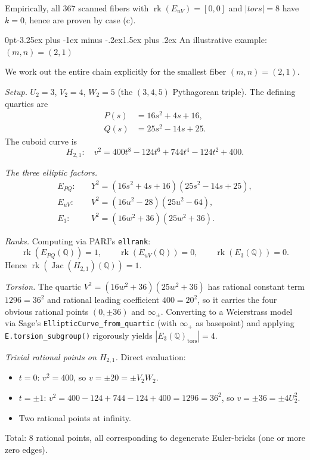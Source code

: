 \documentclass[12pt,a4paper,reqno]{amsart}
\makeatletter
\renewcommand{\subsection}{\@startsection{subsection}{2}%
  {0pt}{-3.25ex plus -1ex minus -.2ex}{1.5ex plus .2ex}%
  {\normalfont\normalsize\bfseries}}
\theoremstyle{plain}
\theoremstyle{definition}
\theoremstyle{remark}
\newcommand{\Q}{\mathbb{Q}}
\newcommand{\Jac}{\operatorname{Jac}}
\newcommand{\rk}{\operatorname{rk}}
\newcommand{\tors}{\mathrm{tors}}
\makeatother
\begin{document}
Empirically, all $367$ scanned fibers with $\rk(E_{uV}) = [0, 0]$ and $|tors| = 8$ have $k = 0$, hence are proven by case (c).

\subsection{An illustrative example: $(m, n) = (2, 1)$}
\label{ssec:example21}

We work out the entire chain explicitly for the smallest fiber $(m, n) = (2, 1)$.

\emph{Setup.} $U_2 = 3$, $V_2 = 4$, $W_2 = 5$ (the $(3, 4, 5)$ Pythagorean triple). The defining quartics are
\begin{align*}
P(s) &= 16 s^2 + 4 s + 16, \\
Q(s) &= 25 s^2 - 14 s + 25.
\end{align*}
The cuboid curve is
$$
H_{2,1}: \quad v^2 = 400 t^8 - 124 t^6 + 744 t^4 - 124 t^2 + 400.
$$

\emph{The three elliptic factors.}
\begin{align*}
E_{PQ}: \quad & Y^2 = (16 s^2 + 4 s + 16)(25 s^2 - 14 s + 25), \\
E_{uV}: \quad & V^2 = (16 u^2 - 28)(25 u^2 - 64), \\
E_3:    \quad & V^2 = (16 w^2 + 36)(25 w^2 + 36).
\end{align*}

\emph{Ranks.} Computing via PARI's \texttt{ellrank}:
$$
\rk(E_{PQ}(\Q)) = 1, \qquad \rk(E_{uV}(\Q)) = 0, \qquad \rk(E_3(\Q)) = 0.
$$
Hence $\rk(\Jac(H_{2,1})(\Q)) = 1$.

\emph{Torsion.} The quartic $V^2 = (16w^2 + 36)(25 w^2 + 36)$ has rational constant term $1296 = 36^2$ and rational leading coefficient $400 = 20^2$, so it carries the four obvious rational points $(0, \pm 36)$ and $\infty_\pm$. Converting to a Weierstrass model via Sage's \texttt{EllipticCurve\_from\_quartic} (with $\infty_+$ as basepoint) and applying \texttt{E.torsion\_subgroup()} rigorously yields $|E_3(\Q)_\tors| = 4$.

\emph{Trivial rational points on $H_{2,1}$.} Direct evaluation:
\begin{itemize}[leftmargin=2em]
    \item $t = 0$: $v^2 = 400$, so $v = \pm 20 = \pm V_2 W_2$.
    \item $t = \pm 1$: $v^2 = 400 - 124 + 744 - 124 + 400 = 1296 = 36^2$, so $v = \pm 36 = \pm 4 U_2^2$.
    \item Two rational points at infinity.
\end{itemize}
Total: $8$ rational points, all corresponding to degenerate Euler-bricks (one or more zero edges).
\end{document}
